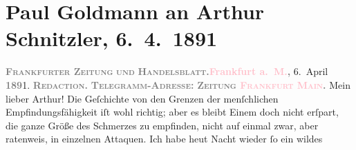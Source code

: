 

               \section[Paul Goldmann an Arthur Schnitzler, 6. 4. 1891]{ Paul Goldmann an Arthur Schnitzler, 6. 4. 1891}\nopagebreak{}\rehead{ }\normalsize\beginnumbering{} \toendnotes[C]{\smallbreak\pagebreak[2]} 
\toendnotes[C]{\smallbreak}\pstart
           \noindent{}{\pb}\textcolor{brown}{\textcolor{gray}{\textbf{\textsc{Frankfurter Zeitung}}}}{}\ledrightnote{\textcolor{brown}{Frankfurter Zeitung}}\pend
           \pstart
           \textcolor{gray}{\textbf{\textsc{und}}}\pend
           \pstart
           \textcolor{gray}{\textbf{\textsc{Handelsblatt.}}}\hfill \textcolor{gray}{\textbf{\textcolor{pink}{Frankfurt a. M.}{}\ledrightnote{\textcolor{pink}{Frankfurt am Main}}, }}6. April \textcolor{gray}{\textbf{189}}1.\pend
           \pstart
           \textcolor{gray}{\textbf{\textbf{\textsc{Redaction.}}}}\pend
           \pstart
           \textcolor{gray}{\textbf{\textbf{\textsc{Telegramm-Adresse:}}}}\pend
           \pstart
           \textcolor{gray}{\textbf{\textbf{\textsc{Zeitung \textcolor{pink}{Frankfurt
                              Main}{}\ledrightnote{\textcolor{pink}{Frankfurt am Main}}.}}}}\pend
           \pstart\center{}Mein lieber Arthur!\pend\pstart
           Die Geſchichte von den Grenzen der menſchlichen Empfindungsfähigkeit iſt wohl
               richtig; aber es bleibt Einem doch nicht erſpart, die ganze Größe des Schmerzes zu
               empfinden, nicht auf einmal zwar, aber ratenweis, in einzelnen Attaquen. Ich habe
                  heut{ }Nacht wieder ſo ein wildes \label{K_L02660-22v}\label{K_L02660-22h}

